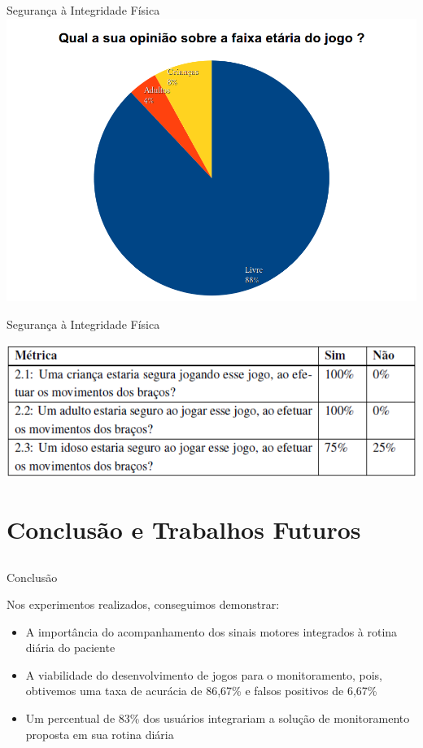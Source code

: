 \documentclass{beamer}
\begin{document}
\begin{frame}{Segurança à Integridade Física} 
			\center \includegraphics[height=2.8 in]{img/chartfaixaetaria.png}
\end{frame}

\begin{frame}{Segurança à Integridade Física} 
    \begin{block}{}
			\center \includegraphics[height=1.4 in]{img/metricasq2.png}
    \end{block}
\end{frame}


\section{Conclusão e Trabalhos Futuros}
\subsection{}

\begin{frame}{Conclusão}
\begin{block}{}
Nos experimentos realizados, conseguimos demonstrar:
  \begin{itemize}
   \item A importância do acompanhamento dos sinais motores integrados à rotina diária do paciente
   \item A viabilidade do desenvolvimento de jogos para o monitoramento, pois, obtivemos uma taxa de acurácia de 86,67\% e falsos positivos de 6,67\%
   \item Um percentual de 83\% dos usuários integrariam a solução de monitoramento proposta em sua rotina diária
  \end{itemize}
\end{block}
\end{frame}
\end{document}
